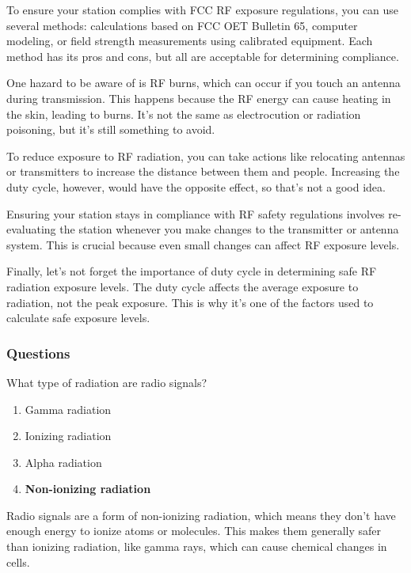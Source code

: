 To ensure your station complies with FCC RF exposure regulations, you can use several methods: calculations based on FCC OET Bulletin 65, computer modeling, or field strength measurements using calibrated equipment. Each method has its pros and cons, but all are acceptable for determining compliance.

One hazard to be aware of is RF burns, which can occur if you touch an antenna during transmission. This happens because the RF energy can cause heating in the skin, leading to burns. It's not the same as electrocution or radiation poisoning, but it's still something to avoid.

To reduce exposure to RF radiation, you can take actions like relocating antennas or transmitters to increase the distance between them and people. Increasing the duty cycle, however, would have the opposite effect, so that's not a good idea.

Ensuring your station stays in compliance with RF safety regulations involves re-evaluating the station whenever you make changes to the transmitter or antenna system. This is crucial because even small changes can affect RF exposure levels.

Finally, let's not forget the importance of duty cycle in determining safe RF radiation exposure levels. The duty cycle affects the average exposure to radiation, not the peak exposure. This is why it's one of the factors used to calculate safe exposure levels.

\subsubsection{Questions}

\begin{tcolorbox}[colback=gray!10!white,colframe=black!75!black,title={T0C01}]
What type of radiation are radio signals?
\begin{enumerate}[label=\Alph*),noitemsep]
    \item Gamma radiation
    \item Ionizing radiation
    \item Alpha radiation
    \item \textbf{Non-ionizing radiation}
\end{enumerate}
\end{tcolorbox}
Radio signals are a form of non-ionizing radiation, which means they don't have enough energy to ionize atoms or molecules. This makes them generally safer than ionizing radiation, like gamma rays, which can cause chemical changes in cells.

